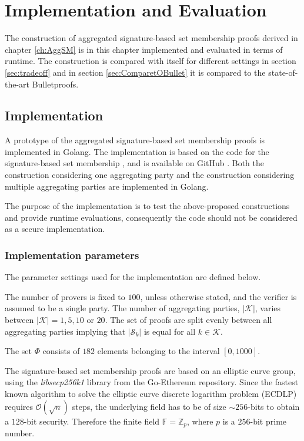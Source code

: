 \chapter{Implementation and Evaluation}
\label{ch:results}
The construction of aggregated signature-based set membership proofs derived in chapter \ref{ch:AggSM} is in this chapter implemented and evaluated in terms of runtime. The construction is compared with itself for different settings in section \ref{sec:tradeoff} and in section \ref{sec:ComparetOBullet} it is compared to the state-of-the-art Bulletproofs. 
\section{Implementation}
A prototype of the aggregated signature-based set membership proofs is implemented in Golang. The implementation is based on the code for the signature-based set membership \cite{Git:RP}, and is available on GitHub \cite{Git:mycode}. Both the construction considering one aggregating party and the construction considering multiple aggregating parties are implemented in Golang. 


The purpose of the implementation is  to test the above-proposed constructions and provide runtime evaluations, consequently the code should not  be considered as a secure implementation.
\subsection*{Implementation parameters}
The parameter settings used for the implementation are defined below. 

The number of provers is fixed to $100$, unless otherwise stated, and the verifier is assumed to be a single party. The number of aggregating parties, $|\mathcal{K}|$, varies between $|\mathcal{K}| = 1,5,10$ or $20$. The set of proofs are split evenly between all aggregating parties implying that $|\mathcal{S}_k|$ is equal for all $k\in\mathcal{K}$.

The set $\Phi$ consists of $182$ elements belonging to  the interval $[0,1000]$.  

The signature-based set membership proofs are based on an elliptic curve group, using the \textit{libsecp256k1} library from the Go-Ethereum repository. Since the fastest known algorithm to solve the elliptic curve discrete logarithm problem (ECDLP) requires $\mathcal{O}(\sqrt{n})$ steps, the underlying field has to be of size $\sim 256$-bits to obtain a $128$-bit security. Therefore the finite field $\mathds{F}= \mathds{Z}_p$, where $p$ is a $256$-bit prime number. 
 

